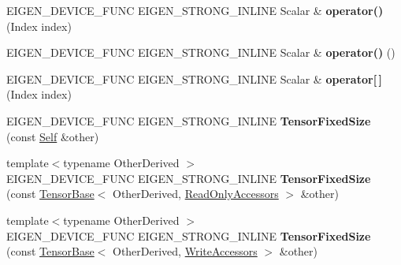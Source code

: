 \begin{DoxyCompactItemize}
\item 
\mbox{\label{class_eigen_1_1_tensor_fixed_size_abc69263e2a0c5fa47238a2b3fd591a63}} 
E\+I\+G\+E\+N\+\_\+\+D\+E\+V\+I\+C\+E\+\_\+\+F\+U\+NC E\+I\+G\+E\+N\+\_\+\+S\+T\+R\+O\+N\+G\+\_\+\+I\+N\+L\+I\+NE Scalar \& {\bfseries operator()} (Index index)
\item 
\mbox{\label{class_eigen_1_1_tensor_fixed_size_a17b0f692638b3b0cbf27eb52ac8bec38}} 
E\+I\+G\+E\+N\+\_\+\+D\+E\+V\+I\+C\+E\+\_\+\+F\+U\+NC E\+I\+G\+E\+N\+\_\+\+S\+T\+R\+O\+N\+G\+\_\+\+I\+N\+L\+I\+NE Scalar \& {\bfseries operator()} ()
\item 
\mbox{\label{class_eigen_1_1_tensor_fixed_size_ae9094e44629422c8fa3516ab84ccf48d}} 
E\+I\+G\+E\+N\+\_\+\+D\+E\+V\+I\+C\+E\+\_\+\+F\+U\+NC E\+I\+G\+E\+N\+\_\+\+S\+T\+R\+O\+N\+G\+\_\+\+I\+N\+L\+I\+NE Scalar \& {\bfseries operator\mbox{[}$\,$\mbox{]}} (Index index)
\item 
\mbox{\label{class_eigen_1_1_tensor_fixed_size_a2d634d188e4393f8b41f72e3e5022b70}} 
E\+I\+G\+E\+N\+\_\+\+D\+E\+V\+I\+C\+E\+\_\+\+F\+U\+NC E\+I\+G\+E\+N\+\_\+\+S\+T\+R\+O\+N\+G\+\_\+\+I\+N\+L\+I\+NE {\bfseries Tensor\+Fixed\+Size} (const \hyperlink{class_eigen_1_1_tensor_fixed_size}{Self} \&other)
\item 
\mbox{\label{class_eigen_1_1_tensor_fixed_size_aaf625b2a75378a0ee259a7fb40080f9c}} 
{\footnotesize template$<$typename Other\+Derived $>$ }\\E\+I\+G\+E\+N\+\_\+\+D\+E\+V\+I\+C\+E\+\_\+\+F\+U\+NC E\+I\+G\+E\+N\+\_\+\+S\+T\+R\+O\+N\+G\+\_\+\+I\+N\+L\+I\+NE {\bfseries Tensor\+Fixed\+Size} (const \hyperlink{class_eigen_1_1_tensor_base}{Tensor\+Base}$<$ Other\+Derived, \hyperlink{group__enums_gga9f93eac38eb83deb0e8dbd42ddf11d5da42865f87356ad7e585a1bfbfd1b81699}{Read\+Only\+Accessors} $>$ \&other)
\item 
\mbox{\label{class_eigen_1_1_tensor_fixed_size_a10cfeabe6c4136871f40e943967218c5}} 
{\footnotesize template$<$typename Other\+Derived $>$ }\\E\+I\+G\+E\+N\+\_\+\+D\+E\+V\+I\+C\+E\+\_\+\+F\+U\+NC E\+I\+G\+E\+N\+\_\+\+S\+T\+R\+O\+N\+G\+\_\+\+I\+N\+L\+I\+NE {\bfseries Tensor\+Fixed\+Size} (const \hyperlink{class_eigen_1_1_tensor_base}{Tensor\+Base}$<$ Other\+Derived, \hyperlink{group__enums_gga9f93eac38eb83deb0e8dbd42ddf11d5da2c59ef3697d65866c3a8e16eda7881ab}{Write\+Accessors} $>$ \&other)

\end{DoxyCompactItemize}
